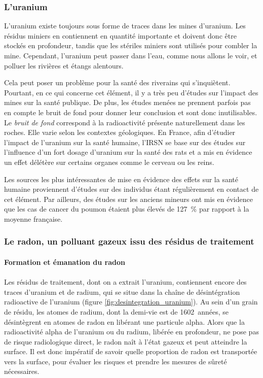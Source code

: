 \documentclass{article}
\begin{document}
\subsubsection{L'uranium}

L'uranium existe toujours sous forme de traces dans les mines d'uranium. Les résidus miniers en contiennent en quantité importante et doivent donc être stockés en profondeur, tandis que les stériles miniers sont utilisés pour combler la mine. Cependant, l'uranium peut passer dans l'eau, comme nous allons le voir, et polluer les rivières et étangs alentours. 

Cela peut poser un problème pour la santé des riverains qui s'inquiètent. Pourtant, en ce qui concerne cet élément, il y a très peu d'études sur l’impact des mines sur la santé publique. De plus, les études menées ne prennent parfois pas en compte le bruit de fond pour donner leur conclusion et sont donc inutilisables. Le \emph{bruit de fond} correspond à la radioactivité présente naturellement dans les roches. Elle varie selon les contextes géologiques. En France, afin d’étudier l’impact de l’uranium sur la santé humaine, l’IRSN se base sur des études sur l’influence d’un fort dosage d’uranium sur la santé des rats et a mis en évidence un effet délétère sur certains organes comme le cerveau ou les reins.

Les sources les plus intéressantes de mise en évidence des effets sur la santé humaine proviennent d'études sur des individus étant régulièrement en contact de cet élément. Par ailleurs, des études sur les anciens mineurs ont mis en évidence que les cas de cancer du poumon étaient plus élevés de 127~\% par rapport à la moyenne française.


\subsubsection{Le radon, un polluant gazeux issu des résidus de traitement}

\paragraph{Formation et émanation du radon}

\paragraph{} Les résidus de traitement, dont on a extrait l’uranium, contiennent encore des traces d’uranium et de radium, qui se situe dans la chaîne de désintégration radioactive de l’uranium (figure \ref{fig:desintegration_uranium}). Au sein d’un grain de résidu, les atomes de radium, dont la demi-vie est de 1602~années, se désintègrent en atomes de radon en libérant une particule alpha. Alors que la radioactivité alpha de l’uranium ou du radium, libérée en profondeur, ne pose pas de risque radiologique direct, le radon naît à l’état gazeux et peut atteindre la surface. Il est donc impératif de savoir quelle proportion de radon est transportée vers la surface, pour évaluer les risques et prendre les mesures de sûreté nécessaires.
\end{document}
